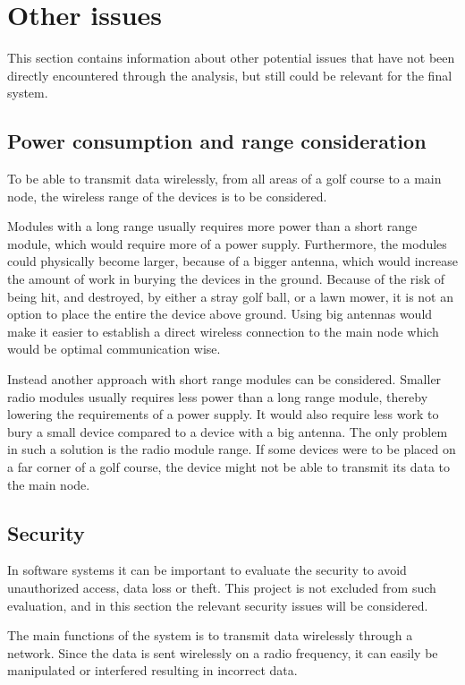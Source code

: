 \section{Other issues}
This section contains information about other potential issues that have not been directly encountered through the analysis, but still could be relevant for the final system.

\subsection{Power consumption and range consideration} \label{cha:batcons}
To be able to transmit data wirelessly, from all areas of a golf course to a main node, the wireless range of the devices is to be considered.

Modules with a long range usually requires more power than a short range module, which would require more of a power supply. Furthermore, the modules could physically become larger, because of a bigger antenna, which would increase the amount of work in burying the devices in the ground. Because of the risk of being hit, and destroyed, by either a stray golf ball, or a lawn mower, it is not an option to place the entire the device above ground. Using big antennas would make it easier to establish a direct wireless connection to the main node which would be optimal communication wise.

Instead another approach with short range modules can be considered. Smaller radio modules usually requires less power than a long range module, thereby lowering the requirements of a power supply. It would also require less work to bury a small device compared to a device with a big antenna. The only problem in such a solution is the radio module range. If some devices were to be placed on a far corner of a golf course, the device might not be able to transmit its data to the main node. 

\subsection{Security}
In software systems it can be important to evaluate the security to avoid unauthorized access, data loss or theft. This project is not excluded from such evaluation, and in this section the relevant security issues will be considered.

The main functions of the system is to transmit data wirelessly through a network. Since the data is sent wirelessly on a radio frequency, it can easily be manipulated or interfered resulting in incorrect data.

